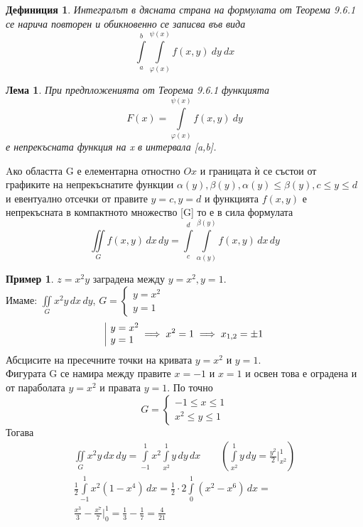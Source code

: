 \documentclass[a4paper,fleqn,12pt]{article}
\newtheorem{lemma}{Лема}[subsection]
\newtheorem{definition}{Дефиниция}[subsection]
\theoremstyle{definition}
\newtheorem{example}{Пример}[subsection]
\begin{document}
\begin{definition}
Интегралът в дясната страна на формулата от Теорема 9.6.1 се нарича повторен и обикновенно се записва във вида
$$\int\limits_a ^b \int\limits_{\varphi(x)} ^{\psi(x)}  f(x,y) \ dy \ dx $$ 
\end{definition}

\begin{lemma}
При предпложенията от Теорема 9.6.1 функцията 
$$F(x) = \int\limits_{\varphi(x)} ^{\psi(x)}  f(x,y) \ dy$$
е непрекъсната функция на x в интервала [a,b]. 
\end{lemma}
Aко областта G е елементарна отностно $Ox$ и границата ѝ се състои от графиките на непрекъснатите функции $\alpha (y), \beta(y), \alpha (y) \leq \beta(y), c \leq y \leq d$ и евентуално отсечки от правите $y = c, y = d$ и функцията $f(x,y)$ е непрекъсната в компактното множество [G] то е в сила формулата 
$$\iint\limits_{G} f(x,y) \, dx \, dy = \int\limits_c ^d \int\limits_{\alpha(y)} ^{\beta(y)}  f(x,y) \, dx  \,dy  $$

\begin{example}
$z = x^2y$ заградена между $y = x^2, y = 1$. \\
Имаме: $\iint\limits_{G} x^2y \,dx \, dy$, 
$G =
\begin{cases}
y = x^2 \\
y = 1
\end{cases}$ 
$$
\begin{array}{|l@{}}
y = x^2 \\
y = 1
\end{array} \implies
x^2 = 1 \implies x_{1,2} = \pm 1 
$$
Абсцисите на пресечните точки на кривата $y = x^2$ и $y = 1$. \\
Фигурата G се намира между правите $x = -1$ и $x = 1$ и освен това е оградена и от параболата $y = x^2$ и правата $y = 1$.  По точно
$$G = 
\begin{cases}
-1 \leq x \leq 1 \\
x^2 \leq y \leq 1
\end{cases}$$
Тогава 
\begin{gather*}
\iint\limits_{G} x^2y \,dx \, dy = \int\limits_{-1} ^ 1 x^2 \int\limits_{x^2} ^ 1 y \, dy \, dx  \qquad 
\left( \int\limits _{x^2} ^ 1 y \, dy  = \frac{y^2}{2}  \Big|_{x^2} ^ 1\right) \\
 \frac{1}{2} \int\limits_{-1} ^1 x^2 (1-x^4) \, dx = \frac{1}{2} \cdot 2 \int\limits_0 ^1 (x^2 - x^6) \, dx =  \\
\frac{x^3}{3} - \frac{x^7}{7} \Big|_0 ^ 1 = \frac{1}{3} - \frac{1}{7} = \frac{4}{21}
\end{gather*}

\end{example}
\end{document}
